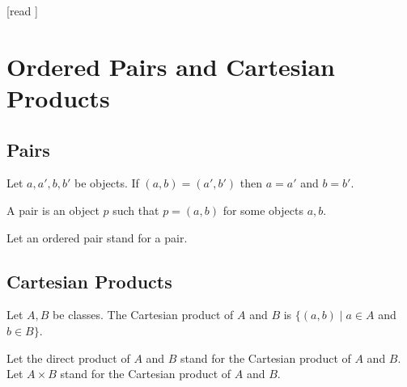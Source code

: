 \documentclass[10pt]{article}
\begin{document}
  \begin{imports}
    \begin{forthel}
      [read ]
    \end{forthel}
  \end{imports}


  \section*{Ordered Pairs and Cartesian Products}

  \subsection*{Pairs}

  \begin{forthel}
    \begin{axiom}[id=FOUNDATIONS_04_8464577431863296,printid]
      Let $a, a', b, b'$ be objects.
      If $(a, b) = (a', b')$ then $a = a'$ and $b = b'$.
    \end{axiom}
  \end{forthel}

  \begin{forthel}
    \begin{definition}[id=FOUNDATIONS_04_4782386822774784,printid]
      A pair is an object $p$ such that $p = (a, b)$ for some objects $a, b$.
    \end{definition}

    Let an ordered pair stand for a pair.
  \end{forthel}


  \subsection*{Cartesian Products}

  \begin{forthel}
    \begin{definition}[id=FOUNDATIONS_04_2877806274936832,printid]
      Let $A, B$ be classes.
      The Cartesian product of $A$ and $B$ is $\{ (a, b) \mid a \in A$ and $b \in B \}$.
    \end{definition}

    Let the direct product of $A$ and $B$ stand for  the Cartesian product of $A$ and $B$.
    Let $A \times B$ stand for the Cartesian product of $A$ and $B$.
  \end{forthel}
\end{document}
